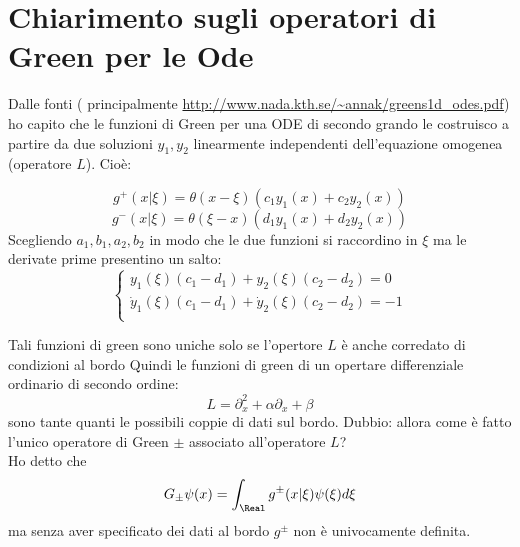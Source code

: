 \documentclass[Main]{subfiles}
\begin{document}
\section{Chiarimento sugli operatori di Green per le Ode}
Dalle fonti ( principalmente \url{http://www.nada.kth.se/~annak/greens1d_odes.pdf}) ho capito che le funzioni di Green per una ODE di secondo grando le costruisco a partire da due soluzioni $y_1, y_2$ linearmente independenti dell'equazione omogenea (operatore $L$).
Cioè:

\begin{displaymath}
	g^+ ( x \vert \xi) = \theta( x-\xi)  \left( c_1 y_1(x) + c_2 y_2(x)\right)
\end{displaymath}
\begin{displaymath}
	g^- ( x \vert \xi) = \theta( \xi-x)  \left( d_1 y_1(x) +d_2  y_2(x)\right)	
\end{displaymath}
Scegliendo $a_1,b_1,a_2,b_2$ in modo che le due funzioni si raccordino in $\xi$ ma le derivate prime presentino un salto:
			\begin{equation}
			\begin{cases}
						y_1(\xi) (c_1-d_1) + y_2(\xi) ( c_2 - d_2) = 0 \\
						\dot{y}_1(\xi) (c_1-d_1) + \dot{y}_2(\xi) ( c_2 - d_2) = -1 \\
            \end{cases}
			\end{equation}

Tali funzioni di green sono uniche solo se l'opertore $L$ è anche corredato di condizioni al bordo
\vspace{1mm}
Quindi le funzioni di green di un opertare differenziale ordinario di secondo ordine:
\begin{displaymath}
L = \partial_x^2 + \alpha \partial_x + \beta
\end{displaymath}
sono tante quanti le possibili coppie di dati sul bordo.
\vspace{2mm}
Dubbio: allora come è fatto l'unico operatore di Green $\pm$ associato all'operatore $L$?\\
Ho detto che 
\begin{displaymath}
	G_\pm \psi(x) = \int_\Real g^\pm(x \vert \xi) \psi(\xi) d\xi
\end{displaymath}
ma senza aver specificato dei dati al bordo $g^\pm$ non è univocamente definita.
\end{document}
